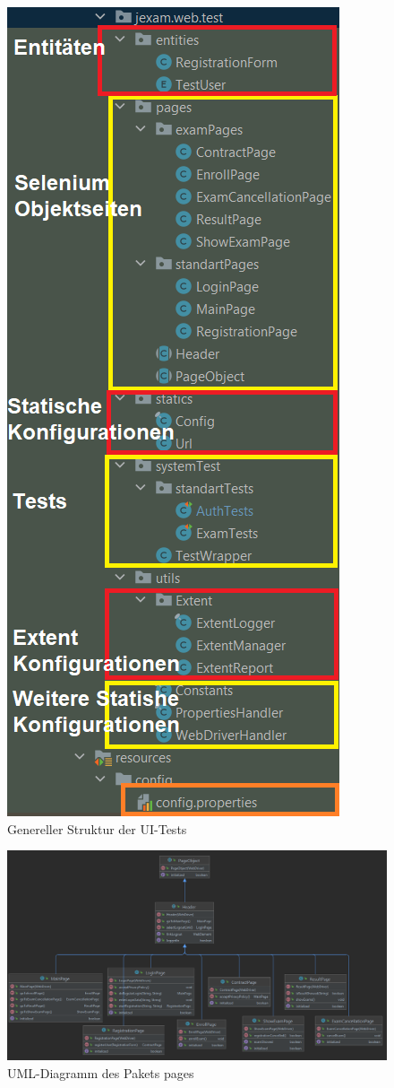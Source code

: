 \begin{figure}[H]
    \centering
    \includegraphics[scale=0.4]{images/ui-test}
    \caption{Genereller Struktur der UI-Tests} \label{fig:ui-test}
\end{figure}

\begin{figure}[H]
    \centering
    \includegraphics[scale=0.4]{images/pages_diagram}
    \caption{UML-Diagramm des Pakets pages} \label{fig:page-package}
\end{figure}

